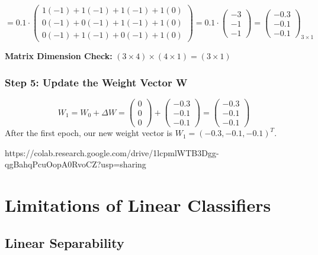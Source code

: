 \[
= 0.1 \cdot \begin{pmatrix}
1(-1) + 1(-1) + 1(-1) + 1(0) \\
0(-1) + 0(-1) + 1(-1) + 1(0) \\
0(-1) + 1(-1) + 0(-1) + 1(0)
\end{pmatrix} = 0.1 \cdot \begin{pmatrix}
-3 \\
-1 \\
-1
\end{pmatrix} = \begin{pmatrix}
-0.3 \\
-0.1 \\
-0.1
\end{pmatrix}_{3 \times 1}
\]

\textbf{Matrix Dimension Check:} \((3 \times 4) \times (4 \times 1) = (3 \times 1)\) 

\subsubsection{Step 5: Update the Weight Vector W}
\[
W_1 = W_0 + \Delta W =
\begin{pmatrix}
0 \\
0 \\
0
\end{pmatrix}
+
\begin{pmatrix}
-0.3 \\
-0.1 \\
-0.1
\end{pmatrix}
=
\begin{pmatrix}
-0.3 \\
-0.1 \\
-0.1
\end{pmatrix}
\]
After the first epoch, our new weight vector is \(W_1 = (-0.3, -0.1, -0.1)^T\).

\begin{codelink}{https://colab.research.google.com/drive/1lcpmlWTB3Dgg-qgBahqPcuOopA0RvoCZ?usp=sharing}
\end{codelink}

\section{Limitations of Linear Classifiers}

\subsection{Linear Separability}

